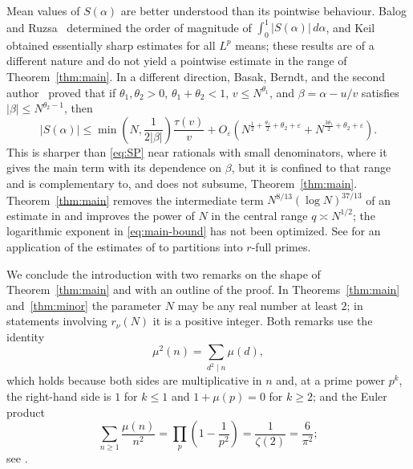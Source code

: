 \documentclass[11pt]{amsart}
\numberwithin{equation}{section}
\numberwithin{figure}{section}
\theoremstyle{definition}
\newcommand{\eps}{\varepsilon}
\begin{document}
Mean values of $S(\alpha)$ are better understood than its pointwise
behaviour.  Balog and Ruzsa~\cite{BR} determined the order of magnitude of
$\int_0^1|S(\alpha)|\,d\alpha$, and Keil~\cite{Keil} obtained essentially
sharp estimates for all $L^p$ means; these results are of a different
nature and do not yield a pointwise estimate in the range of
Theorem~\ref{thm:main}.  In a different direction, Basak, Berndt, and
the second author~\cite[Section~10]{BBZ} proved that if $\theta_1,\theta_2>0$,
$\theta_1+\theta_2<1$, $v\le N^{\theta_1}$, and
$\beta=\alpha-u/v$ satisfies $|\beta|\le N^{\theta_2-1}$, then
\[
  |S(\alpha)|\le\min\left(N,\frac1{2|\beta|}\right)\frac{\tau(v)}v
  +O_{\eps}\left(N^{\frac12+\frac{\theta_1}2+\theta_2+\eps}
  +N^{\frac{3\theta_1}2+\theta_2+\eps}\right).
\]
This is sharper than \eqref{eq:SP}
near rationals with small denominators, where it gives the main term with
its dependence on $\beta$, but it is confined to that range and is
complementary to, and does not subsume, Theorem~\ref{thm:main}.  Theorem~\ref{thm:main} removes the intermediate term
$N^{8/13}(\log N)^{37/13}$ of an estimate in \cite{DRZZ} and improves the
power of $N$ in the central range $q\asymp N^{1/2}$; the logarithmic
exponent in \eqref{eq:main-bound} has not been optimized. See
\cite{DRZZ2} for an application of the estimates of \cite{DRZZ} to
partitions into $r$-full primes.

We conclude the introduction with two remarks on the shape of
Theorem~\ref{thm:main} and with an outline of the proof.  In
Theorems~\ref{thm:main} and~\ref{thm:minor} the parameter $N$ may be any
real number at least $2$; in statements involving $r_\nu(N)$ it is a
positive integer.  Both remarks use the identity
\begin{equation}\label{eq:mu2}
  \mu^2(n)=\sum_{d^2\mid n}\mu(d),
\end{equation}
which holds because both sides are multiplicative in $n$ and, at a prime
power $p^k$, the right-hand side is $1$ for $k\le1$ and $1+\mu(p)=0$ for
$k\ge2$; and the Euler product
\begin{equation}\label{eq:zeta2}
  \sum_{n\ge1}\frac{\mu(n)}{n^2}=\prod_p\left(1-\frac1{p^2}\right)
  =\frac1{\zeta(2)}=\frac6{\pi^2};
\end{equation}
see \cite[Chapter~1]{MV}.
\end{document}
